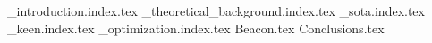 \setcounter{page}{1}
{_introduction.index.tex}
{_theoretical_background.index.tex}
{_sota.index.tex}
{_keen.index.tex}
{_optimization.index.tex}
{Beacon.tex}
{Conclusions.tex}
